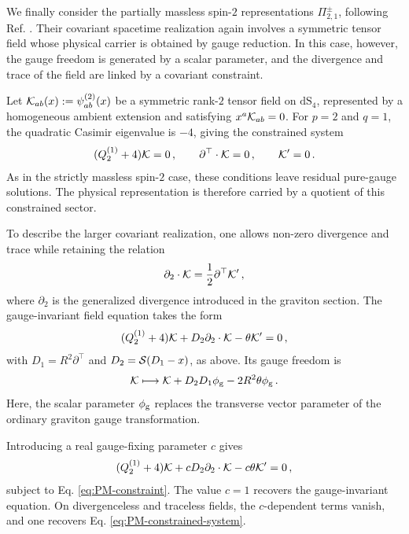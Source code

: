 \documentclass{SciPost}
\begin{document}
We finally consider the partially massless spin-$2$ representations $\Pi^\pm_{2,1}$, following Ref. \cite{GravPartially}. Their covariant spacetime realization again involves a symmetric tensor field whose physical carrier is obtained by gauge reduction. In this case, however, the gauge freedom is generated by a scalar parameter, and the divergence and trace of the field are linked by a covariant constraint.

Let ${\cal K}_{ab}(x):=\psi^{(2)}_{ab}(x)$ be a symmetric rank-$2$ tensor field on $\mathrm{dS}_4$, represented by a homogeneous ambient extension and satisfying $x^a{\cal K}_{ab}=0$. For $p=2$ and $q=1$, the quadratic Casimir eigenvalue is $-4$, giving the constrained system
\begin{align}\label{eq:PM-constrained-system}
    (Q^{(1)}_2+4){\cal K}=0 \,,
    \qquad
    \partial^{\top}\cdot{\cal K}=0 \,,
    \qquad
    {\cal K}^{\prime}=0 \,.
\end{align}
As in the strictly massless spin-$2$ case, these conditions leave residual pure-gauge solutions. The physical representation is therefore carried by a quotient of this constrained sector.

To describe the larger covariant realization, one allows non-zero divergence and trace while retaining the relation
\begin{align}\label{eq:PM-constraint}
    \partial_2\cdot{\cal K}
    =
    \frac12\partial^{\top}{\cal K}^{\prime} \,,
\end{align}
where $\partial_2$ is the generalized divergence introduced in the graviton section. The gauge-invariant field equation takes the form
\begin{align}\label{eq:PM-field-equation}
    (Q^{(1)}_2+4){\cal K}
    +D_2\partial_2\cdot{\cal K}
    -\theta{\cal K}^{\prime}=0 \,,
\end{align}
with $D_1=R^2\partial^{\top}$ and $D_2={\cal S}(D_1-x)$, as above. Its gauge freedom is
\begin{align}\label{eq:PM-gauge-transformation}
    {\cal K}
    \longmapsto
    {\cal K}
    +D_2D_1\phi_{\rm g}
    -2R^2\theta\phi_{\rm g} \,.
\end{align}
Here, the scalar parameter $\phi_{\rm g}$ replaces the transverse vector parameter of the ordinary graviton gauge transformation.

Introducing a real gauge-fixing parameter $c$ gives
\begin{align}\label{eq:PM-gauge}
    (Q^{(1)}_2+4){\cal K}
    +cD_2\partial_2\cdot{\cal K}
    -c\theta{\cal K}^{\prime}=0 \,,
\end{align}
subject to Eq. \eqref{eq:PM-constraint}. The value $c=1$ recovers the gauge-invariant equation. On divergenceless and traceless fields, the $c$-dependent terms vanish, and one recovers Eq. \eqref{eq:PM-constrained-system}.
\end{document}
